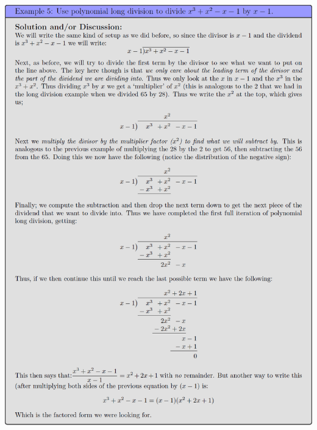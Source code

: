 \documentclass{ximeraXloud}
\begin{document}
        \begin{image}
            \includegraphics[width=\textwidth]{exPolyLongDivision.png}
        \end{image}
        
\end{document}
